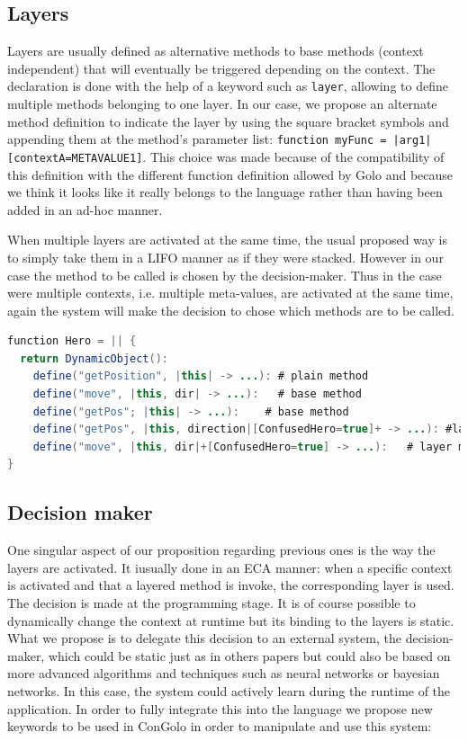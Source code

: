 \documentclass[a4paper]{article}
\begin{document}
\subsection{Layers}
\label{subsection:layers}
Layers are usually defined as alternative methods to base methods (context independent) that will eventually be triggered depending on the context. The declaration is done with the help of a keyword such as \lstinline|layer|, allowing to define multiple methods belonging to one layer. In our case, we propose an alternate method definition to indicate the layer by using the square bracket symbols and appending them at the method's parameter list: \lstinline!function myFunc = |arg1|[contextA=METAVALUE1]!. This choice was made because of the compatibility of this definition with the different function definition allowed by Golo and because we think it looks like it really belongs to the language rather than having been added in an ad-hoc manner.

When multiple layers are activated at the same time, the usual proposed way is to simply take them in a LIFO manner as if they were stacked. However in our case the method to be called is chosen by the decision-maker. Thus in the case were multiple contexts, i.e. multiple meta-values, are activated at the same time, again the system will make the decision to chose which methods are to be called.

\begin{lstlisting}[float, language=Java, caption=ConGolo layers example, label={listing:congololayers}]
function Hero = || {
  return DynamicObject():
    define("getPosition", |this| -> ...): # plain method
    define("move", |this, dir| -> ...):   # base method
    define("getPos"; |this| -> ...):    # base method
    define("getPos", |this, direction|[ConfusedHero=true]+ -> ...): #layer declaration, invoked before base method
    define("move", |this, dir|+[ConfusedHero=true] -> ...):   # layer method, invoked after base method
}
\end{lstlisting}

\subsection{Decision maker}
\label{subsection:decisionmaker}

One singular aspect of our proposition regarding previous ones is the way the layers are activated. It iusually done in an ECA manner: when a specific context is activated and that a layered method is invoke, the corresponding layer is used. The decision is made at the programming stage. It is of course possible to dynamically change the context at runtime but its binding to the layers is static. What we propose is to delegate this decision to an external system, the decision-maker, which could be static just as in others papers but could also be based on more advanced algorithms and techniques such as neural networks or bayesian networks. In this case, the system could actively learn during the runtime of the application. In order to fully integrate this into the language we propose new keywords to be used in ConGolo in order to manipulate and use this system:
\end{document}
